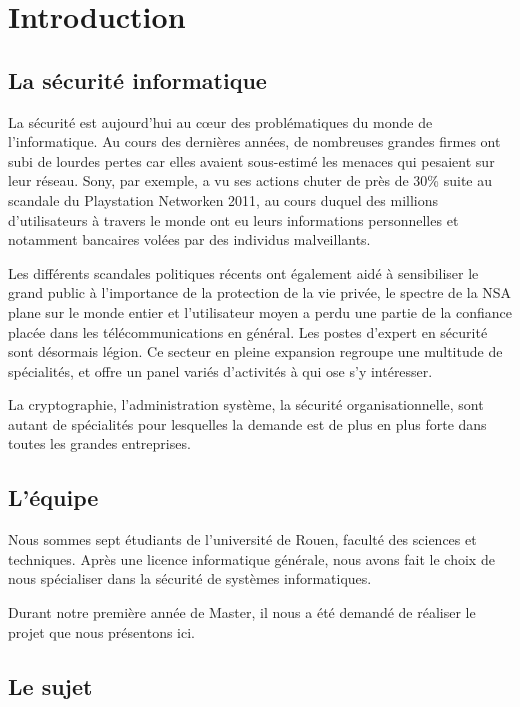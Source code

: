\chapter{Introduction}

\section{La sécurité informatique}

La sécurité est aujourd'hui au cœur des problématiques du monde de l'informatique. Au cours des dernières années, de nombreuses grandes firmes ont subi de lourdes pertes car elles avaient sous-estimé les menaces qui pesaient sur leur réseau. Sony\textregistered, par exemple, a vu ses actions chuter de près de 30\% suite au scandale du Playstation Network\texttrademark en 2011, au cours duquel des millions d'utilisateurs à travers le monde ont eu leurs informations personnelles et  notamment bancaires volées par des individus malveillants.

 Les différents scandales politiques récents ont également aidé à sensibiliser le grand public à l'importance de la protection de la vie privée, le spectre de la NSA plane sur le monde entier et l'utilisateur moyen a perdu une partie de la confiance placée dans les télécommunications en général. Les postes d'expert en sécurité sont désormais légion. Ce secteur en pleine expansion regroupe une multitude de spécialités, et offre un panel variés d'activités à qui ose s'y intéresser.
 
La cryptographie, l'administration système, la sécurité organisationnelle, sont autant de spécialités pour lesquelles la demande est de plus en plus forte dans toutes les grandes entreprises. 



\section{L'équipe}

Nous sommes sept étudiants de l'université de Rouen, faculté des sciences et techniques. Après une licence informatique générale, nous avons fait le choix de nous spécialiser dans la sécurité de systèmes informatiques.

 Durant notre première année de Master, il nous a été demandé de réaliser le projet que nous présentons ici.
 
 
\section{Le sujet}